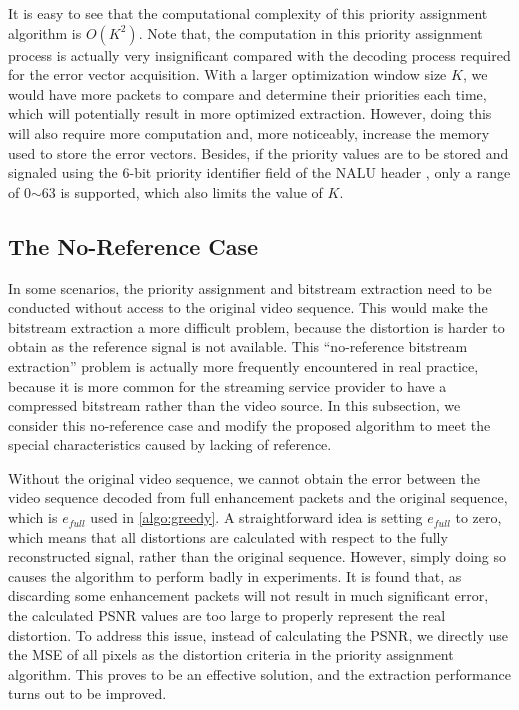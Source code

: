\documentclass[journal]{IEEEtran}
\begin{document}
It is easy to see that the computational complexity of this priority assignment algorithm is $O(K^2)$. Note that, the computation in this priority assignment process is actually very insignificant compared with the decoding process required for the error vector acquisition. With a larger optimization window size $K$, we would have more packets to compare and determine their priorities each time, which will potentially result in more optimized extraction. However, doing this will also require more computation and, more noticeably, increase the memory used to store the error vectors. Besides, if the priority values are to be stored and signaled using the 6-bit priority identifier field of the NALU header \cite{Amonou07}, only a range of 0$\sim$63 is supported, which also limits the value of $K$.

\subsection{The No-Reference Case}
\label{subsec:noref-case}

In some scenarios, the priority assignment and bitstream extraction need to be conducted without access to the original video sequence. This would make the bitstream extraction a more difficult problem, because the distortion is harder to obtain as the reference signal is not available. This ``no-reference bitstream extraction'' problem is actually more frequently encountered in real practice, because it is more common for the streaming service provider to have a compressed bitstream rather than the video source. In this subsection, we consider this no-reference case and modify the proposed algorithm to meet the special characteristics caused by lacking of reference.

Without the original video sequence, we cannot obtain the error between the video sequence decoded from full enhancement packets and the original sequence, which is $e_{full}$ used in \ref{algo:greedy}. A straightforward idea is setting $e_{full}$ to zero, which means that all distortions are calculated with respect to the fully reconstructed signal, rather than the original sequence. However, simply doing so causes the algorithm to perform badly in experiments. It is found that, as discarding some enhancement packets will not result in much significant error, the calculated PSNR values are too large to properly represent the real distortion. To address this issue, instead of calculating the PSNR, we directly use the MSE of all pixels as the distortion criteria in the priority assignment algorithm. This proves to be an effective solution, and the extraction performance turns out to be improved.
\end{document}

